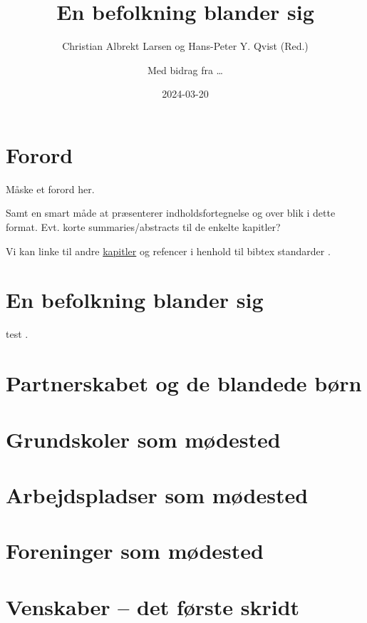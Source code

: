 \documentclass[
]{book}
\title{En befolkning blander sig}
\author{Christian Albrekt Larsen og Hans-Peter Y. Qvist (Red.) \and Med bidrag fra \ldots{}}
\date{2024-03-20}
\begin{document}
\maketitle

{
\setcounter{tocdepth}{1}
\tableofcontents
}
\hypertarget{forord}{%
\chapter*{Forord}\label{forord}}

Måske et forord her.

Samt en smart måde at præsenterer indholdsfortegnelse og over blik i dette format. Evt. korte summaries/abstracts til de enkelte kapitler?

Vi kan linke til andre \protect\hyperlink{kap1}{kapitler} og refencer i henhold til bibtex standarder \citep{xie2015}.

\hypertarget{kap1}{%
\chapter{En befolkning blander sig}\label{kap1}}

test \citep{xie2015}.

\hypertarget{kap2}{%
\chapter{Partnerskabet og de blandede børn}\label{kap2}}

\hypertarget{kap3}{%
\chapter{Grundskoler som mødested}\label{kap3}}

\hypertarget{kap4}{%
\chapter{Arbejdspladser som mødested}\label{kap4}}

\hypertarget{kap5}{%
\chapter{Foreninger som mødested}\label{kap5}}

\hypertarget{kap6}{%
\chapter{Venskaber -- det første skridt}\label{kap6}}
\end{document}
